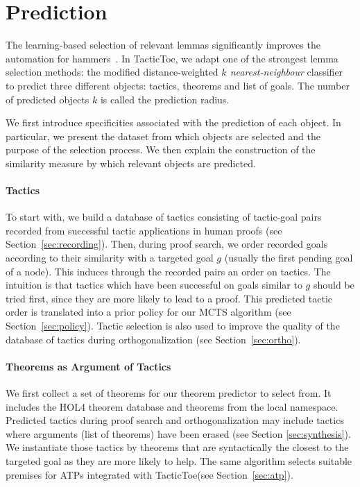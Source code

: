 \documentclass[runningheads,a4paper,draft]{svjour3}
\def\holfour{\textsf{HOL4}\xspace}
\def\tactictoe{\textsf{TacticToe}\xspace}
\begin{document}
\section{Prediction}\label{s:prediction}
The learning-based selection of relevant lemmas significantly improves the
automation for hammers~\cite{BlanchetteGKKU16}. In \tactictoe, we adapt
one of the strongest lemma selection
methods: the modified distance-weighted \emph{$k$ nearest-neighbour}
classifier~\cite{ckju-pxtp13,DudaniS76} to predict three different objects:
 tactics, theorems and list of goals. The number of predicted objects $k$ is
 called the prediction radius.

We first introduce specificities associated with the prediction of each object.
In particular, we present the dataset from which objects are selected and the
purpose of the selection process.
We then explain the construction of the similarity measure by which relevant
objects are predicted.

\paragraph{Tactics}
To start with, we build a database of tactics consisting
of tactic-goal pairs recorded from successful tactic applications in human
proofs (see
Section~\ref{sec:recording}).
Then, during proof search, we order recorded goals according to their
similarity with a targeted goal $g$ (usually the first pending goal of a node).
This induces
through the recorded pairs an
order on tactics. The intuition is that tactics which have been successful on
goals similar to $g$ should be tried first, since they are more likely to lead
to a proof.
This predicted tactic order is translated into a prior policy for our MCTS
algorithm (see Section~\ref{sec:policy}).
Tactic selection is also used to improve the quality of the database
of tactics during orthogonalization (see Section~\ref{sec:ortho}).

\paragraph{Theorems as Argument of Tactics}
We first collect a set of theorems for our theorem predictor to select from.
It includes the \holfour theorem database and theorems from the local namespace.
Predicted tactics during proof search and orthogonalization may include
tactics where arguments (list of theorems) have been erased (see Section
\ref{sec:synthesis}).
We instantiate those tactics by theorems that are syntactically the closest to
the targeted goal as they are more likely to help.
The same algorithm selects suitable premises for ATPs integrated with
\tactictoe (see Section~\ref{sec:atp}).
\end{document}
